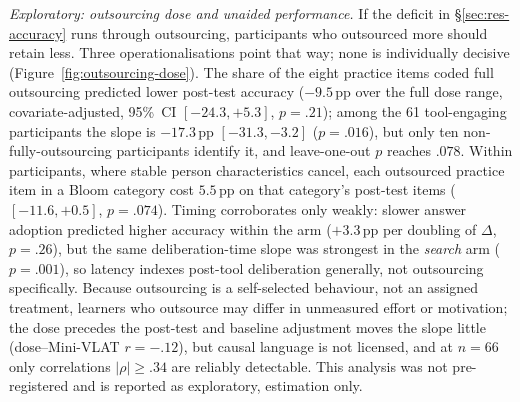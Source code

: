 %

\emph{Exploratory: outsourcing dose and unaided performance.} If the deficit in
\S\ref{sec:res-accuracy} runs through outsourcing, participants who outsourced
more should retain less. Three operationalisations point that way; none is
individually decisive (Figure~\ref{fig:outsourcing-dose}). The share of the
eight practice items coded full outsourcing predicted lower post-test accuracy
($-9.5$\,pp over the full dose range, covariate-adjusted, 95\%~CI
$[-24.3, +5.3]$, $p=.21$); among the 61 tool-engaging participants the slope is
$-17.3$\,pp $[-31.3, -3.2]$ ($p=.016$), but only ten
non-fully-outsourcing participants identify it, and leave-one-out $p$ reaches
$.078$. Within participants, where stable person characteristics cancel, each
outsourced practice item in a Bloom category cost $5.5$\,pp on that category's
post-test items ($[-11.6, +0.5]$, $p=.074$). Timing corroborates only weakly:
slower answer adoption predicted higher accuracy within the arm ($+3.3$\,pp per
doubling of $\Delta$, $p=.26$), but the same deliberation-time slope was
strongest in the \emph{search} arm ($p=.001$), so latency indexes post-tool
deliberation generally, not outsourcing specifically. Because outsourcing is a
self-selected behaviour, not an assigned treatment, learners who outsource may
differ in unmeasured effort or motivation; the dose precedes the post-test and
baseline adjustment moves the slope little (dose--Mini-VLAT $r=-.12$), but
causal language is not licensed, and at $n=66$ only correlations
$|\rho|\ge.34$ are reliably detectable. This analysis was not pre-registered
and is reported as exploratory, estimation only.

